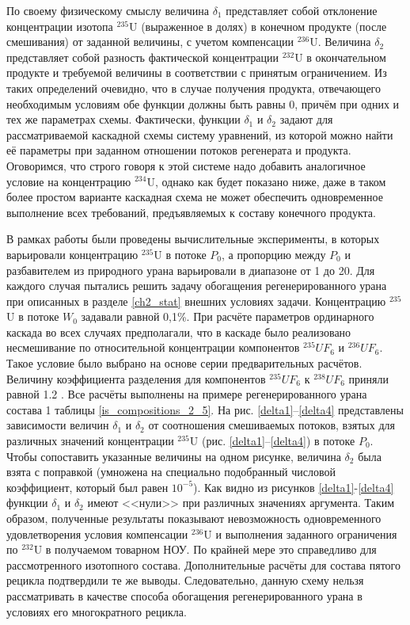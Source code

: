 По своему физическому смыслу величина $\delta_1$ представляет собой отклонение концентрации изотопа $^{235}$U (выраженное в долях) в конечном продукте (после смешивания) от заданной величины, с учетом компенсации $^{236}$U. Величина $\delta_2$ представляет собой разность фактической концентрации $^{232}$U в окончательном продукте и требуемой величины в соответствии с принятым ограничением. Из таких определений очевидно, что в случае получения продукта, отвечающего необходимым условиям обе функции должны быть равны 0, причём при одних и тех же параметрах схемы. Фактически, функции $\delta_1$ и $\delta_2$ задают для рассматриваемой каскадной схемы систему уравнений, из которой можно найти её параметры при заданном отношении потоков регенерата и продукта. Оговоримся, что строго говоря к этой системе надо добавить аналогичное условие на концентрацию $^{234}$U, однако как будет показано ниже, даже в таком более простом варианте каскадная схема не может обеспечить одновременное выполнение всех требований, предъявляемых к составу конечного продукта.   

В рамках работы были проведены вычислительные эксперименты, в которых варьировали концентрацию $^{235}$U в потоке $P_0$, а пропорцию между $P_0$ и разбавителем из природного урана варьировали в диапазоне от 1 до 20. Для каждого случая пытались решить задачу обогащения регенерированного урана при описанных в разделе \ref{ch2_stat} внешних условиях задачи. Концентрацию $^{235}$U в потоке $W_0$ задавали равной 0,1\%. При расчёте параметров ординарного каскада во всех случаях предполагали, что в каскаде было реализовано несмешивание по относительной концентрации компонентов $^{235}UF_6$ и $^{236}UF_6$. Такое условие было выбрано на основе серии предварительных расчётов. Величину коэффициента разделения для компонентов  $^{235}UF_6$ к $^{238}UF_6$ приняли равной 1.2  \cite{smirnovEvolutionIsotopicComposition2012}. Все расчёты выполнены на примере регенерированного урана состава 1 таблицы \ref{is_compositions_2_5}.
На рис. \ref{delta1}--\ref{delta4} представлены зависимости величин $\delta_1$ и $\delta_2$ от соотношения смешиваемых потоков, взятых для различных значений концентрации $^{235}$U (рис. \ref{delta1}--\ref{delta4}) в потоке $P_0$. Чтобы сопоставить указанные величины на одном рисунке, величина $\delta_2$ была взята с поправкой (умножена на специально подобранный числовой коэффициент, который был равен $10^{-5}$).
Как видно из рисунков \ref{delta1}-\ref{delta4} функции $\delta_1$ и $\delta_2$ имеют <<нули>> при различных значениях аргумента. Таким образом, полученные результаты показывают невозможность одновременного удовлетворения условия компенсации $^{236}$U и выполнения заданного ограничения по $^{232}$U в получаемом товарном НОУ. По крайней мере это справедливо для рассмотренного изотопного состава. Дополнительные расчёты для состава пятого рецикла подтвердили те же выводы. Следовательно, данную схему нельзя рассматривать в качестве способа обогащения регенерированного урана в условиях его многократного рецикла.


